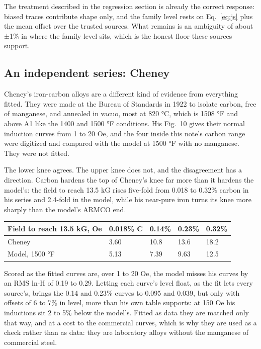 \documentclass[
  11pt,
]{article}
\newcounter{none} %
\begin{document}
The treatment described in the regression section is already the correct response: biased traces contribute shape only, and the family level rests on Eq.~\eqref{eq:js} plus the mean offset over the trusted sources. What remains is an ambiguity of about ±1\% in where the family level sits, which is the honest floor these sources support.

\subsection{An independent series: Cheney}\label{an-independent-series-cheney}

Cheney's iron-carbon alloys \cite{cheney} are a different kind of evidence from everything fitted. They were made at the Bureau of Standards in 1922 to isolate carbon, free of manganese, and annealed in vacuo, most at 820 °C, which is 1508 °F and above A1 like the 1400 and 1500 °F conditions. His Fig.~10 gives their normal induction curves from 1 to 20 Oe, and the four inside this note's carbon range were digitized and compared with the model at 1500 °F with no manganese. They were not fitted.

The lower knee agrees. The upper knee does not, and the disagreement has a direction. Carbon hardens the top of Cheney's knee far more than it hardens the model's: the field to reach 13.5 kG rises five-fold from 0.018 to 0.32\% carbon in his series and 2.4-fold in the model, while his near-pure iron turns its knee more sharply than the model's ARMCO end.

{\def\LTcaptype{none} %
\begin{longtable}[]{@{}lllll@{}}
\toprule\noalign{}
Field to reach 13.5 kG, Oe & 0.018\% C & 0.14\% & 0.23\% & 0.32\% \\
\midrule\noalign{}
\endhead
\bottomrule\noalign{}
\endlastfoot
Cheney & 3.60 & 10.8 & 13.6 & 18.2 \\
Model, 1500 °F & 5.13 & 7.39 & 9.63 & 12.5 \\
\end{longtable}
}

Scored as the fitted curves are, over 1 to 20 Oe, the model misses his curves by an RMS ln-H of 0.19 to 0.29. Letting each curve's level float, as the fit lets every source's, brings the 0.14 and 0.23\% curves to 0.095 and 0.039, but only with offsets of 6 to 7\% in level, more than his own table supports: at 150 Oe his inductions sit 2 to 5\% below the model's. Fitted as data they are matched only that way, and at a cost to the commercial curves, which is why they are used as a check rather than as data: they are laboratory alloys without the manganese of commercial steel.
\end{document}
